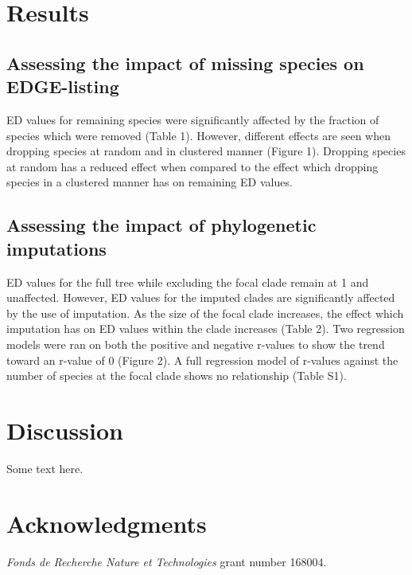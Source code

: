 \documentclass[12pt,english]{article}
\begin{document}
\section*{Results}
\subsection*{Assessing the impact of missing species on EDGE-listing}

ED values for remaining species were significantly affected by the
fraction of species which were removed (Table 1). However, different
effects are seen when dropping species at random and in clustered
manner (Figure 1). Dropping species at random has a reduced effect
when compared to the effect which dropping species in a clustered
manner has on remaining ED values.

\subsection*{Assessing the impact of phylogenetic imputations}

ED values for the full tree while excluding the focal clade remain at
1 and unaffected. However, ED values for the imputed clades are
significantly affected by the use of imputation. As the size of the
focal clade increases, the effect which imputation has on ED values
within the clade increases (Table 2). Two regression models were ran
on both the positive and negative r-values to show the trend toward an
r-value of 0 (Figure 2). A full regression model of r-values against
the number of species at the focal clade shows no relationship (Table
S1).

\section*{Discussion}
Some text here.

\section*{Acknowledgments}
\emph{Fonds de Recherche Nature et Technologies} grant number 168004.
\clearpage
\printbibliography
\end{document}
